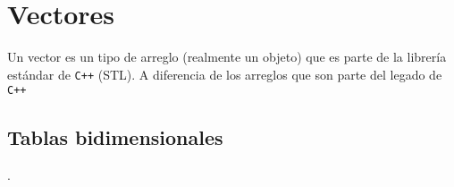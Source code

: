 \chapter{Vectores}

Un vector es un tipo de arreglo (realmente un objeto) que es parte de la librería estándar de \texttt{C++} (STL). A diferencia de los arreglos que son parte del legado de \texttt{C++}

\section{Tablas bidimensionales}

.